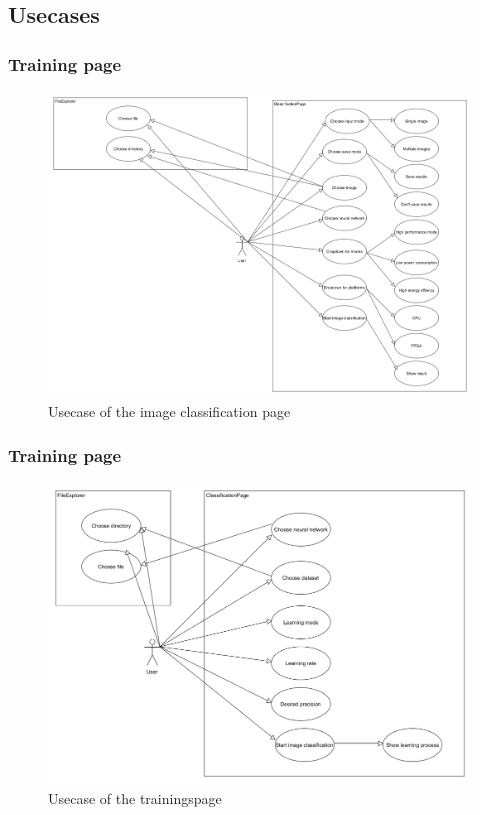 \documentclass[parskip=full]{scrartcl}
\begin{document}
\subsection{Usecases}
\subsubsection{Training page}
\begin{figure}[htb!]
\centering
\includegraphics[width=\textwidth]{ClassificationUsecase}
\caption{Usecase of the image classification page}
\end{figure}
\subsubsection{Training page}
\begin{figure}[htb!]
\centering
\includegraphics[width=\textwidth]{TrainUsecase}
\caption{Usecase of the trainingspage}
\end{figure}
\end{document}
